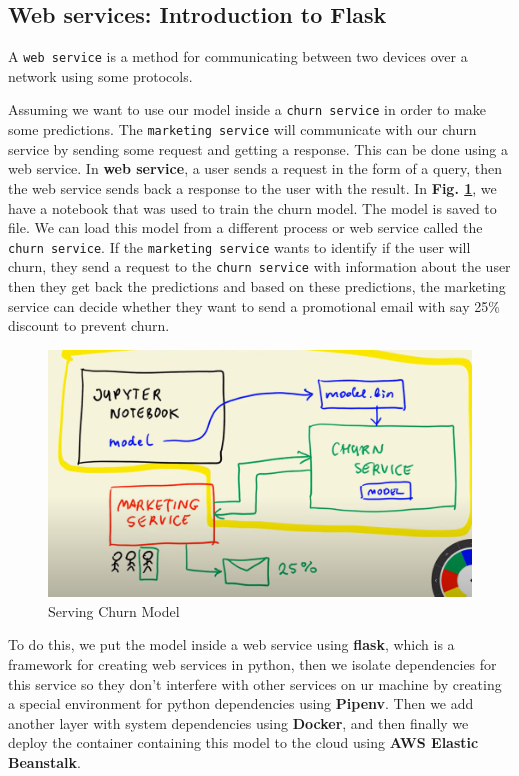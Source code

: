 \documentclass[letterpaper,12pt,notitlepage,twoside]{report}
\begin{document}
\subsection{Web services: Introduction to Flask}
    \begin{mathaside}[frametitle=\mathtitle{Web \color{firebrick}{Service}}]
       A  \texttt{web service} is a method for communicating between two devices over a network using some protocols.
    \end{mathaside}
Assuming we want to use our model inside a \texttt{churn service} in order to make some predictions. The \texttt{marketing service} will communicate with our churn service by sending some request and getting a response. This can be done using a web service. In \textbf{web service}, a user sends a request in the form of a query, then the web service sends back a response to the user with the result.  In \textbf{Fig. \ref{fig:7}}, we have a notebook that was used to train the churn model. The model is saved to file. We can load this model from a different process or web service called the \texttt{churn service}. If the \texttt{marketing service} wants to identify if the user will churn, they send a request to the \texttt{churn service} with information about the user then they get back the predictions and based on these predictions, the marketing service can decide whether they want to send a promotional email with say 25\% discount to prevent churn.  

\begin{figure}[h]
	\centering
	\includegraphics[width=\textwidth]{Images/model-serving.png}
	\caption{Serving Churn Model}
	\label{fig:7}
\end{figure}
\FloatBarrier

To do this, we put the model inside a web service using \textbf{flask}, which is a framework for creating web services in python, then we isolate dependencies for this service so they don't interfere with other services on ur machine by creating a special environment for python dependencies using \textbf{Pipenv}. Then we add another layer with system dependencies using \textbf{Docker}, and then finally we deploy the container containing this model to the cloud using \textbf{AWS Elastic Beanstalk}.
\end{document}
